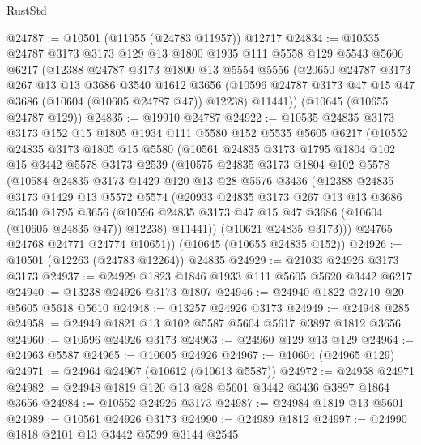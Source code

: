 \begin{lexlean}{RustStd}
\begin{coremodule}
@24787 := @10501 (@11955 (@24783 @11957)) @12717
@24834 := @10535
    @24787
    @3173
    @3173
    @129
    @13
    @1800
    @1935
    @111
    @5558
    @129
    @5543
    @5606
    @6217
    (@12388
      @24787
      @3173
      @1800
      @13
      @5554
      @5556
      (@20650
        @24787
        @3173
        @267
        @13
        @13
        @3686
        @3540
        @1612
        @3656
        (@10596 @24787 @3173 @47 @15 @47 @3686 (@10604 (@10605 @24787 @47)) @12238)
        @11441))
    (@10645 (@10655 @24787 @129))
@24835 := @19910 @24787
@24922 := @10535
    @24835
    @3173
    @3173
    @152
    @15
    @1805
    @1934
    @111
    @5580
    @152
    @5535
    @5605
    @6217
    (@10552
      @24835
      @3173
      @1805
      @15
      @5580
      (@10561
        @24835
        @3173
        @1795
        @1804
        @102
        @15
        @3442
        @5578
        @3173
        @2539
        (@10575
          @24835
          @3173
          @1804
          @102
          @5578
          (@10584
            @24835
            @3173
            @1429
            @120
            @13
            @28
            @5576
            @3436
            (@12388
              @24835
              @3173
              @1429
              @13
              @5572
              @5574
              (@20933
                @24835
                @3173
                @267
                @13
                @13
                @3686
                @3540
                @1795
                @3656
                (@10596 @24835 @3173 @47 @15 @47 @3686 (@10604 (@10605 @24835 @47)) @12238)
                @11441))
            (@10621 @24835 @3173)))
        @24765
        @24768
        @24771
        @24774
        @10651))
    (@10645 (@10655 @24835 @152))
@24926 := @10501 (@12263 (@24783 @12264)) @24835
@24929 := @21033 @24926 @3173 @3173
@24937 := @24929 @1823 @1846 @1933 @111 @5605 @5620 @3442 @6217
@24940 := @13238 @24926 @3173 @1807
@24946 := @24940 @1822 @2710 @20 @5605 @5618 @5610
@24948 := @13257 @24926 @3173
@24949 := @24948 @285
@24958 := @24949 @1821 @13 @102 @5587 @5604 @5617 @3897 @1812 @3656
@24960 := @10596 @24926 @3173
@24963 := @24960 @129 @13 @129
@24964 := @24963 @5587
@24965 := @10605 @24926
@24967 := @10604 (@24965 @129)
@24971 := @24964 @24967 (@10612 (@10613 @5587))
@24972 := @24958 @24971
@24982 := @24948 @1819 @120 @13 @28 @5601 @3442 @3436 @3897 @1864 @3656
@24984 := @10552 @24926 @3173
@24987 := @24984 @1819 @13 @5601
@24989 := @10561 @24926 @3173
@24990 := @24989 @1812
@24997 := @24990 @1818 @2101 @13 @3442 @5599 @3144 @2545

\end{coremodule}
\end{lexlean}
